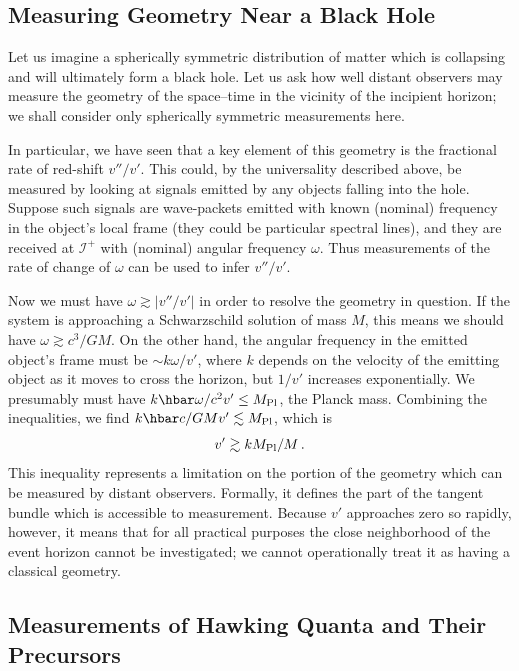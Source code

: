 \documentclass[12pt]{article}
\newcommand{\scrif}{{{\mathscr I}^{+}}}
\begin{document}
\subsection{Measuring Geometry Near a Black Hole}

Let us imagine a spherically symmetric distribution of matter which is collapsing and will ultimately form a black hole.  Let us ask how well distant observers may measure the geometry of the space--time in the vicinity of the incipient horizon; we shall consider only spherically symmetric measurements here.

In particular, we have seen that a key element of this geometry is the fractional rate of red-shift $v''/v'$.  This could, by the universality described above, be measured by looking at signals emitted by any objects falling into the hole. Suppose such signals are wave-packets emitted with known (nominal) frequency in the object's local frame (they could be particular spectral lines), and they are received at $\scrif$ with (nominal) angular frequency $\omega$.  Thus measurements of the rate of change of $\omega$ can be used to infer $v''/v'$.  

Now we must have $\omega\gtrsim |v''/v'|$ in order to resolve the geometry in question. If the system is approaching a Schwarzschild solution of mass $M$, this means we should have $\omega\gtrsim c^3/GM$.
On the other hand, the angular frequency in the emitted object's frame must be $\sim k\omega /v'$, where $k$ depends on the velocity of the emitting object as it moves to cross the horizon, but $1/v'$ increases exponentially.  We presumably must have $k\hbar \omega /c^2v'\leq M_{\rm Pl}$, the Planck mass. 
Combining the inequalities, we find $k\hbar c/GMv'\lesssim M_{\rm Pl}$, which is
\begin{equation}
  v'\gtrsim kM_{\rm Pl}/M\, .
\end{equation}
This inequality represents a limitation on the portion of the geometry which can be measured by distant observers.
Formally, it defines the part of the tangent bundle which is accessible to measurement.  Because $v'$ approaches zero so rapidly, however, it means that for all practical purposes the close neighborhood of the event horizon cannot be investigated; we cannot operationally treat it as having a classical geometry.

\subsection{Measurements of Hawking Quanta and Their Precursors}
\end{document}
